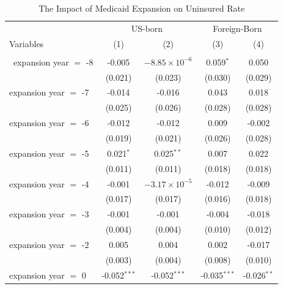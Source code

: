 \documentclass[
]{article}
\begin{document}
\begin{table}[htbp]
   \caption{The Impact of Medicaid Expansion on Uninsured Rate }
   \centering
   \small
   \begin{tabular}{lcccc}
      \tabularnewline \midrule \midrule
       & \multicolumn{2}{c}{US-born} & \multicolumn{2}{c}{Foreign-Born} \\ \cmidrule(lr){2-3} \cmidrule(lr){4-5}
      Variables             & (1)            & (2)                    & (3)            & (4)\\  
      \midrule \\\
      expansion year $=$ -8 & -0.005         & $-8.85\times 10^{-6}$  & 0.059$^{*}$    & 0.050\\   
                            & (0.021)        & (0.023)                & (0.030)        & (0.029)\\   
      expansion year $=$ -7 & -0.014         & -0.016                 & 0.043          & 0.018\\   
                            & (0.025)        & (0.026)                & (0.028)        & (0.028)\\   
      expansion year $=$ -6 & -0.012         & -0.012                 & 0.009          & -0.002\\   
                            & (0.019)        & (0.021)                & (0.026)        & (0.028)\\   
      expansion year $=$ -5 & 0.021$^{*}$    & 0.025$^{**}$           & 0.007          & 0.022\\   
                            & (0.011)        & (0.011)                & (0.018)        & (0.018)\\   
      expansion year $=$ -4 & -0.001         & $-3.17\times 10^{-5}$  & -0.012         & -0.009\\   
                            & (0.017)        & (0.017)                & (0.016)        & (0.018)\\   
      expansion year $=$ -3 & -0.001         & -0.001                 & -0.004         & -0.018\\   
                            & (0.004)        & (0.004)                & (0.010)        & (0.012)\\   
      expansion year $=$ -2 & 0.005          & 0.004                  & 0.002          & -0.017\\   
                            & (0.003)        & (0.004)                & (0.008)        & (0.010)\\   
      expansion year $=$ 0  & -0.052$^{***}$ & -0.052$^{***}$         & -0.035$^{***}$ & -0.026$^{**}$\\   

\end{tabular}
\end{table}
\end{document}
